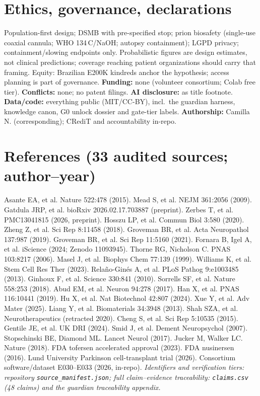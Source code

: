 \documentclass[10pt,twocolumn]{article}
\begin{document}
\section{Ethics, governance, declarations}
Population-first design; DSMB with pre-specified stop; prion biosafety (single-use coaxial cannula; WHO 134\,\textdegree C/NaOH; autopsy containment); LGPD privacy; containment/slowing endpoints only. Probabilistic figures are design estimates, not clinical predictions; coverage reaching patient organizations should carry that framing. Equity: Brazilian E200K kindreds anchor the hypothesis; access planning is part of governance. \textbf{Funding:} none (volunteer consortium; Colab free tier). \textbf{Conflicts:} none; no patent filings. \textbf{AI disclosure:} as title footnote. \textbf{Data/code:} everything public (MIT/CC-BY), incl.\ the guardian harness, knowledge canon, G0 unlock dossier and gate-tier labels. \textbf{Authorship:} Camilla N. (corresponding); CRediT and accountability in-repo.

\section*{References (33 audited sources; author--year)}
\small
Asante EA, et al. Nature 522:478 (2015). Mead S, et al. NEJM 361:2056 (2009). Gatdula JRP, et al. bioRxiv 2026.02.17.703887 (preprint). Zerbes T, et al. PMC13041815 (2026, preprint). Hosszu LP, et al. Commun Biol 3:580 (2020). Zheng Z, et al. Sci Rep 8:11458 (2018). Groveman BR, et al. Acta Neuropathol 137:987 (2019). Groveman BR, et al. Sci Rep 11:5160 (2021). Fornara B, Igel A, et al. iScience (2024; Zenodo 11093945). Thorne RG, Nicholson C. PNAS 103:8217 (2006). Masel J, et al. Biophys Chem 77:139 (1999). Williams K, et al. Stem Cell Res Ther (2023). Rela\~no-Gin\'es A, et al. PLoS Pathog 9:e1003485 (2013). Ginhoux F, et al. Science 330:841 (2010). Sorrells SF, et al. Nature 558:253 (2018). Abud EM, et al. Neuron 94:278 (2017). Han X, et al. PNAS 116:10441 (2019). Hu X, et al. Nat Biotechnol 42:807 (2024). Xue Y, et al. Adv Mater (2025). Liang Y, et al. Biomaterials 34:3948 (2013). Shah SZA, et al. Neurotherapeutics (retracted 2020). Cheng S, et al. Sci Rep 5:10535 (2015). Gentile JE, et al. UK DRI (2024). Smid J, et al. Dement Neuropsychol (2007). Stopschinski BE, Diamond ML. Lancet Neurol (2017). Jucker M, Walker LC. Nature (2018). FDA tofersen accelerated approval (2023). FDA nusinersen (2016). Lund University Parkinson cell-transplant trial (2026). Consortium software/dataset E030--E033 (2026, in-repo). \emph{Identifiers and verification tiers: repository \texttt{source\_manifest.json}; full claim--evidence traceability: \texttt{claims.csv} (48 claims) and the guardian traceability appendix.}
\end{document}
